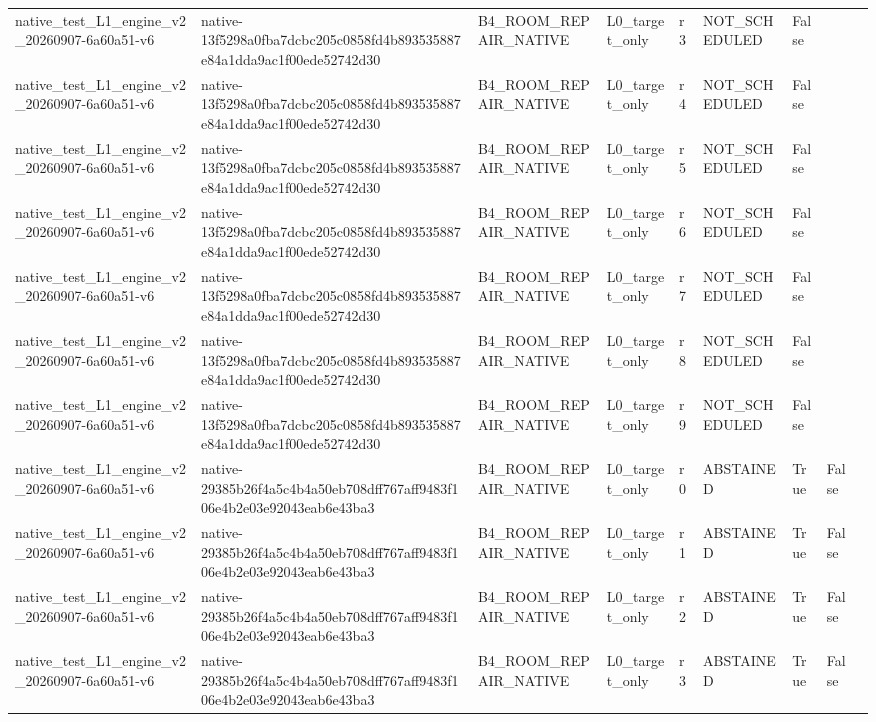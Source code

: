 \begin{tabular}{lllllllll}
native\_test\_L1\_engine\_v2\_20260907-6a60a51-v6 & native-13f5298a0fba7dcbc205c0858fd4b893535887e84a1dda9ac1f00ede52742d30 & B4\_ROOM\_REPAIR\_NATIVE & L0\_target\_only & r3 & NOT\_SCHEDULED & False &  &  \\
native\_test\_L1\_engine\_v2\_20260907-6a60a51-v6 & native-13f5298a0fba7dcbc205c0858fd4b893535887e84a1dda9ac1f00ede52742d30 & B4\_ROOM\_REPAIR\_NATIVE & L0\_target\_only & r4 & NOT\_SCHEDULED & False &  &  \\
native\_test\_L1\_engine\_v2\_20260907-6a60a51-v6 & native-13f5298a0fba7dcbc205c0858fd4b893535887e84a1dda9ac1f00ede52742d30 & B4\_ROOM\_REPAIR\_NATIVE & L0\_target\_only & r5 & NOT\_SCHEDULED & False &  &  \\
native\_test\_L1\_engine\_v2\_20260907-6a60a51-v6 & native-13f5298a0fba7dcbc205c0858fd4b893535887e84a1dda9ac1f00ede52742d30 & B4\_ROOM\_REPAIR\_NATIVE & L0\_target\_only & r6 & NOT\_SCHEDULED & False &  &  \\
native\_test\_L1\_engine\_v2\_20260907-6a60a51-v6 & native-13f5298a0fba7dcbc205c0858fd4b893535887e84a1dda9ac1f00ede52742d30 & B4\_ROOM\_REPAIR\_NATIVE & L0\_target\_only & r7 & NOT\_SCHEDULED & False &  &  \\
native\_test\_L1\_engine\_v2\_20260907-6a60a51-v6 & native-13f5298a0fba7dcbc205c0858fd4b893535887e84a1dda9ac1f00ede52742d30 & B4\_ROOM\_REPAIR\_NATIVE & L0\_target\_only & r8 & NOT\_SCHEDULED & False &  &  \\
native\_test\_L1\_engine\_v2\_20260907-6a60a51-v6 & native-13f5298a0fba7dcbc205c0858fd4b893535887e84a1dda9ac1f00ede52742d30 & B4\_ROOM\_REPAIR\_NATIVE & L0\_target\_only & r9 & NOT\_SCHEDULED & False &  &  \\
native\_test\_L1\_engine\_v2\_20260907-6a60a51-v6 & native-29385b26f4a5c4b4a50eb708dff767aff9483f106e4b2e03e92043eab6e43ba3 & B4\_ROOM\_REPAIR\_NATIVE & L0\_target\_only & r0 & ABSTAINED & True & False &  \\
native\_test\_L1\_engine\_v2\_20260907-6a60a51-v6 & native-29385b26f4a5c4b4a50eb708dff767aff9483f106e4b2e03e92043eab6e43ba3 & B4\_ROOM\_REPAIR\_NATIVE & L0\_target\_only & r1 & ABSTAINED & True & False &  \\
native\_test\_L1\_engine\_v2\_20260907-6a60a51-v6 & native-29385b26f4a5c4b4a50eb708dff767aff9483f106e4b2e03e92043eab6e43ba3 & B4\_ROOM\_REPAIR\_NATIVE & L0\_target\_only & r2 & ABSTAINED & True & False &  \\
native\_test\_L1\_engine\_v2\_20260907-6a60a51-v6 & native-29385b26f4a5c4b4a50eb708dff767aff9483f106e4b2e03e92043eab6e43ba3 & B4\_ROOM\_REPAIR\_NATIVE & L0\_target\_only & r3 & ABSTAINED & True & False &  \\

\end{tabular}
